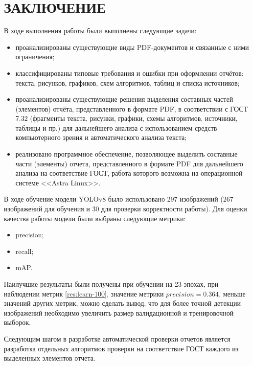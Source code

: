 \chapter*{ЗАКЛЮЧЕНИЕ}

В ходе выполнения работы были выполнены следующие задачи:
\begin{itemize}
	\item проанализированы существующие виды PDF-документов и связанные с ними ограничения;
	\item классифицированы типовые требования и ошибки при оформлении отчётов: текста, рисунков, графиков, схем алгоритмов, таблиц и списка источников;
	\item проанализированы существующие решения выделения составных частей (элементов) отчёта, представленного в формате PDF, в соответствии с ГОСТ 7.32 (фрагменты текста, рисунки, графики, схемы алгоритмов, источники, таблицы и пр.) для дальнейшего анализа с использованием средств компьютерного зрения и автоматического анализа текста;
	\item реализовано программное обеспечение, позволяющее выделить составные части (элементы) отчета, представленного в формате PDF для дальнейшего анализа на соответствие ГОСТ, работа которого возможна на операционной системе <<Astra Linux>>.
\end{itemize}

В ходе обучение модели YOLOv8 было использовано 297 изображений (267 изображений для обучения и 30 для проверки корректности работы). Для оценки качества работы модели были выбраны следующие метрики:
\begin{itemize}
\item precision;
\item recall;
\item mAP.
\end{itemize}
Наилучшие результаты были получены при обучении на 23 эпохах, при наблюдении метрик \ref{res:learn-100}, значение метрики $precision = 0.364$, меньше значений
других метрик, можно сделать вывод, что для более точной детекции изображений необходимо увеличить размер валидационной и тренировочной выборок.

Следующим шагом в разработке автоматической проверки отчетов является разработка отдельных алгоритмов проверки на соответствие ГОСТ каждого из выделенных элементов отчета.
